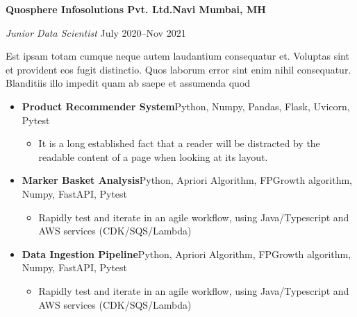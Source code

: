 \textbf{Quosphere Infosolutions Pvt. Ltd.\hfill Navi Mumbai, MH}\par

\textit{Junior Data Scientist} \hfill July 2020--Nov 2021

Est ipsam totam cumque neque autem laudantium consequatur et. Voluptas sint et provident eos fugit distinctio. Quos laborum error sint enim nihil consequatur. Blanditiis illo impedit quam ab saepe et assumenda quod
\begin{itemize}
	\item \textbf{Product Recommender System}\hfill Python, Numpy, Pandas, Flask, Uvicorn, Pytest
	\begin{itemize}
		\item It is a long established fact that a reader will be distracted by the readable content of a page when looking at its layout.
	\end{itemize}
	\item \textbf{Marker Basket Analysis}\hfill Python, Apriori Algorithm, FPGrowth algorithm, Numpy, FastAPI, Pytest
	\begin{itemize}
		\item Rapidly test and iterate in an agile workflow, using Java/Typescript and AWS services (CDK/SQS/Lambda)
	\end{itemize}
	\item \textbf{Data Ingestion Pipeline}\hfill Python, Apriori Algorithm, FPGrowth algorithm, Numpy, FastAPI, Pytest
	\begin{itemize}
		\item Rapidly test and iterate in an agile workflow, using Java/Typescript and AWS services (CDK/SQS/Lambda)
	\end{itemize}
\end{itemize}\par